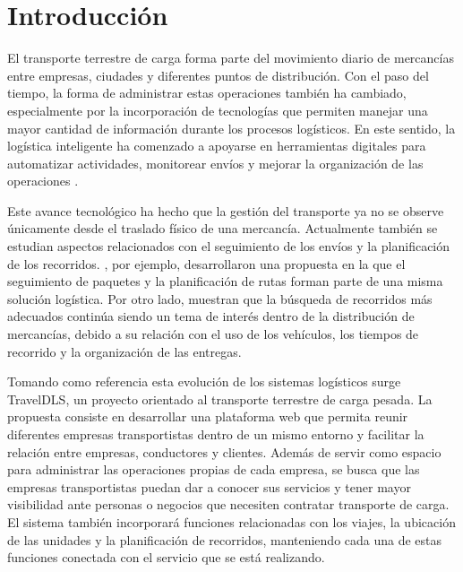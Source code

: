 

\section{Introducción}

El transporte terrestre de carga forma parte del movimiento diario de mercancías entre empresas, ciudades y diferentes puntos de distribución. Con el paso del tiempo, la forma de administrar estas operaciones también ha cambiado, especialmente por la incorporación de tecnologías que permiten manejar una mayor cantidad de información durante los procesos logísticos. En este sentido, la logística inteligente ha comenzado a apoyarse en herramientas digitales para automatizar actividades, monitorear envíos y mejorar la organización de las operaciones \parencite{kalkha2023rising}.

Este avance tecnológico ha hecho que la gestión del transporte ya no se observe únicamente desde el traslado físico de una mercancía. Actualmente también se estudian aspectos relacionados con el seguimiento de los envíos y la planificación de los recorridos. \textcite{zhang2024ecommerce}, por ejemplo, desarrollaron una propuesta en la que el seguimiento de paquetes y la planificación de rutas forman parte de una misma solución logística. Por otro lado, \textcite{xin2022logistics} muestran que la búsqueda de recorridos más adecuados continúa siendo un tema de interés dentro de la distribución de mercancías, debido a su relación con el uso de los vehículos, los tiempos de recorrido y la organización de las entregas.

Tomando como referencia esta evolución de los sistemas logísticos surge TravelDLS, un proyecto orientado al transporte terrestre de carga pesada. La propuesta consiste en desarrollar una plataforma web que permita reunir diferentes empresas transportistas dentro de un mismo entorno y facilitar la relación entre empresas, conductores y clientes. Además de servir como espacio para administrar las operaciones propias de cada empresa, se busca que las empresas transportistas puedan dar a conocer sus servicios y tener mayor visibilidad ante personas o negocios que necesiten contratar transporte de carga. El sistema también incorporará funciones relacionadas con los viajes, la ubicación de las unidades y la planificación de recorridos, manteniendo cada una de estas funciones conectada con el servicio que se está realizando.

